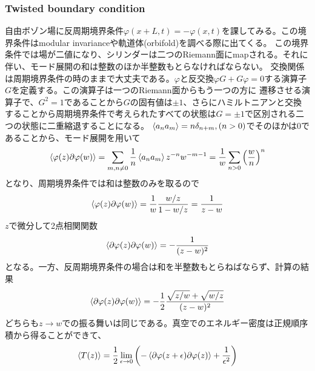 \documentclass[11pt, aps, longbibliography]{article}
\numberwithin{equation}{section}
\begin{document}
        \subsubsection{Twisted boundary condition}
        自由ボゾン場に反周期境界条件$\varphi(x+L, t) = -\varphi(x, t)$を課してみる。この境界条件はmodular invarianceや軌道体(orbifold)を調べる際に出てくる。
        この境界条件では場が二値になり、シリンダーは二つのRiemann面にmapされる。それに伴い、モード展開の和は整数のほか半整数もとらなければならない。
        交換関係は周期境界条件の時のままで大丈夫である。$\varphi$と反交換$\varphi G+G\varphi=0$する演算子$G$を定義する。この演算子は一つのRiemann面からもう一つの方に
        遷移させる演算子で、$G^2=1$であることから$G$の固有値は$\pm1$、さらにハミルトニアンと交換することから周期境界条件で考えられたすべての状態は$G=\pm1$で区別される二つの状態に二重縮退することになる。
        $\expval{a_na_m}= n\delta_{n+m}, (n>0)$でそのほかは0であることから、モード展開を用いて
        \begin{equation}\label{eq:freeboson4-1}
            \expval{\varphi(z)\partial \varphi(w)} = \sum_{m,n\neq0}\frac{1}{n}\expval{a_na_m}z^{-n}w^{-m-1} = \frac{1}{w}\sum_{n>0}\left( \frac{w}{n} \right)^n
        \end{equation}
        となり、周期境界条件では和は整数のみを取るので
        \begin{equation}\label{eq:freeboson4-2}
            \expval{\varphi(z)\partial \varphi(w)} = \frac{1}{w} \frac{w/z}{1-w/z} = \frac{1}{z-w}
        \end{equation}
        $z$で微分して2点相関関数
        \begin{equation}\label{eq:freeboson4-3}
            \expval{\partial\varphi(z)\partial \varphi(w)} = -\frac{1}{(z-w)^2}
        \end{equation}
        となる。一方、反周期境界条件の場合は和を半整数もとらねばならず、計算の結果
        \begin{equation}\label{eq:freeboson4-4}
            \expval{\partial\varphi(z)\partial \varphi(w)} = -\frac{1}{2} \frac{\sqrt{z/w} + \sqrt{w/z}}{(z-w)^2}
        \end{equation}
        どちらも$z\rightarrow w$での振る舞いは同じである。真空でのエネルギー密度は正規順序積から得ることができて、
        \begin{equation}\label{eq:freeboson4-5}
            \expval{T(z)} = \frac{1}{2}\lim_{\epsilon \rightarrow 0}\left( -\expval{\partial \varphi(z+\epsilon)\partial \varphi(z)} + \frac{1}{\epsilon^2} \right)
        \end{equation}
\end{document}
